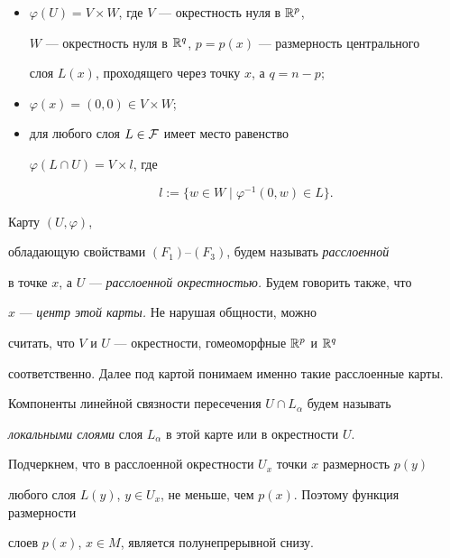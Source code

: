 \begin{itemize}


\item[$(F_1)$] $\varphi (U)=V\times W$, где $V$ --- окрестность нуля в ${\Bbb R}^p$,


$W$ --- окрестность нуля в ${\Bbb R}^q$, $p=p(x)$ --- размерность центрального


слоя $L(x)$, проходящего через точку $x$, а $q=n-p$;


\item[$(F_2)$] $\varphi (x)=(0,0)\in V\times W$;


\item[$(F_3)$] для любого слоя $L\in\cal F$ имеет место равенство


$\varphi(L\cap U)=V\times l$, где


$$


l:=\{w\in W \mid \varphi^{-1}(0,w)\in L\}.


$$


\end{itemize}





Карту $(U,\varphi)$, 


обладающую свойствами $(F_1)$--$(F_3)$, будем называть {\it расслоенной}


в точке $x$, а $U$ --- {\it расслоенной окрестностью.} Будем говорить также, что


$x$ --- {\it центр этой карты.} Не нарушая общности, можно


считать, что $V$ и $U$ --- окрестности, гомеоморфные  ${\Bbb R}^p$ и ${\Bbb R}^q$


соответственно. Далее под картой понимаем именно такие расслоенные карты.





Компоненты линейной связности пересечения $U\cap L_{\alpha}$ будем называть


{\it локальными слоями} слоя $L_{\alpha}$ в этой карте или в окрестности $U$.





Подчеркнем, что в расслоенной окрестности $U_x$ точки $x$ размерность $p(y)$


любого слоя $L(y)$, $y\in U_x$, не меньше, чем $p(x)$. Поэтому функция размерности


слоев $p(x)$, $x\in M$, является полунепрерывной снизу.





